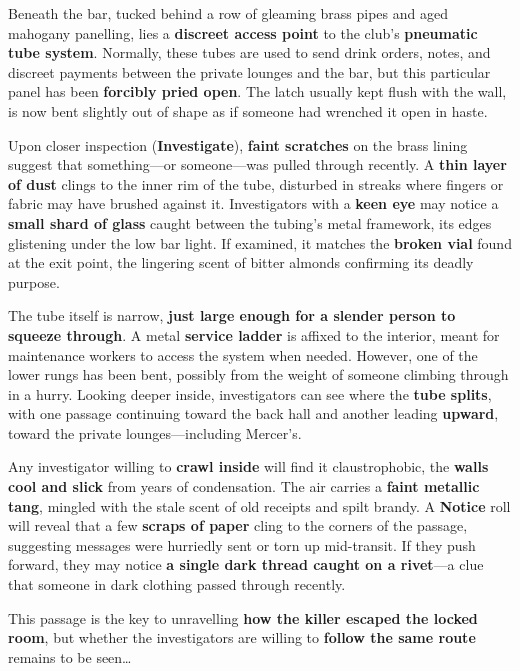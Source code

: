 \begin{WyrdExplanation}
	Beneath the bar, tucked behind a row of gleaming brass pipes and aged mahogany panelling, lies a \textbf{discreet access point} to the club’s \textbf{pneumatic tube system}. Normally, these tubes are used to send drink orders, notes, and discreet payments between the private lounges and the bar, but this particular panel has been \textbf{forcibly pried open}. The latch usually kept flush with the wall, is now bent slightly out of shape as if someone had wrenched it open in haste.  

	Upon closer inspection (\Challenging \textbf{Investigate}), \textbf{faint scratches} on the brass lining suggest that something—or someone—was pulled through recently. A \textbf{thin layer of dust} clings to the inner rim of the tube, disturbed in streaks where fingers or fabric may have brushed against it. Investigators with a \textbf{keen eye} may notice a \textbf{small shard of glass} caught between the tubing's metal framework, its edges glistening under the low bar light. If examined, it matches the \textbf{broken vial} found at the exit point, the lingering scent of bitter almonds confirming its deadly purpose.  

	The tube itself is narrow, \textbf{just large enough for a slender person to squeeze through}. A metal \textbf{service ladder} is affixed to the interior, meant for maintenance workers to access the system when needed. However, one of the lower rungs has been bent, possibly from the weight of someone climbing through in a hurry. Looking deeper inside, investigators can see where the \textbf{tube splits}, with one passage continuing toward the back hall and another leading \textbf{upward}, toward the private lounges—including Mercer’s.  	
\end{WyrdExplanation}


Any investigator willing to \textbf{crawl inside} will find it claustrophobic, the \textbf{walls cool and slick} from years of condensation. The air carries a \textbf{faint metallic tang}, mingled with the stale scent of old receipts and spilt brandy. A \Difficult \textbf{Notice} roll will reveal that a few \textbf{scraps of paper} cling to the corners of the passage, suggesting messages were hurriedly sent or torn up mid-transit. If they push forward, they may notice \textbf{a single dark thread caught on a rivet}—a clue that someone in dark clothing passed through recently.  

This passage is the key to unravelling \textbf{how the killer escaped the locked room}, but whether the investigators are willing to \textbf{follow the same route} remains to be seen…  


